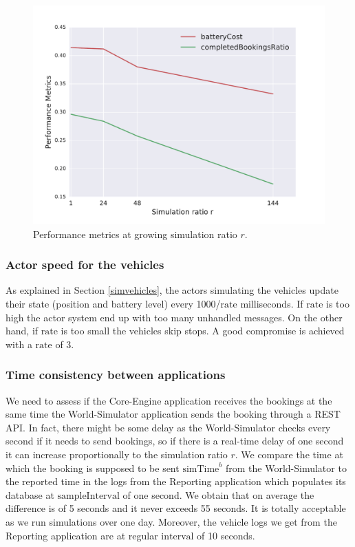\documentclass[12pt,a4paper]{article}
\begin{document}
\begin{figure} 
  \centering
  \vspace{-0.5em}
\includegraphics[scale=0.7]{./images/stability.pdf}
\caption{Performance metrics at growing simulation ratio $r$.}
\label{fig:stability}
\end{figure}

\subsubsection{Actor speed for the vehicles} As explained in Section \ref{simvehicles}, the actors simulating the vehicles update their state (position and battery level) every 1000/$\text{rate}$ milliseconds. If $\text{rate}$ is too high the actor system end up with too many unhandled messages. On the other hand, if $\text{rate}$ is too small the vehicles skip stops. A good compromise is achieved with a $\text{rate}$ of 3.

\subsubsection{Time consistency between applications} We need to assess if the Core-Engine application receives the bookings at the same time the World-Simulator application sends the booking through a REST API. In fact, there might be some delay as the World-Simulator checks every second if it needs to send bookings, so if there is a real-time delay of one second it can increase proportionally to the simulation ratio $r$. We compare the time at which the booking is supposed to be sent $\text{simTime}^{b}$ from the World-Simulator to the reported time in the logs from the Reporting application which populates its database at $\text{sampleInterval}$ of one second. We obtain that on average the difference is of 5 seconds and it never exceeds 55 seconds. It is totally acceptable as we run simulations over one day. Moreover, the vehicle logs we get from the Reporting application are at regular $\text{interval}$ of 10 seconds.
\end{document}
